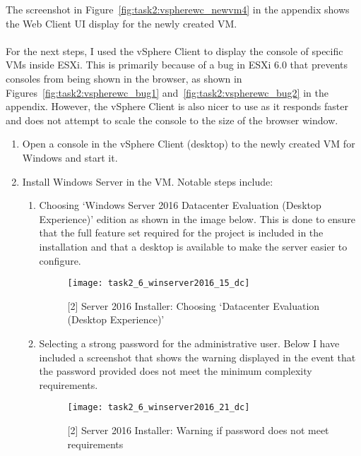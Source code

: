 \noindent The screenshot in Figure~\ref{fig:task2:vspherewc_newvm4} in the  appendix shows the Web Client UI display for the newly created VM.\\\\
\noindent For the next steps, I used the vSphere Client to display the console of specific VMs inside ESXi. This is primarily because of a bug in ESXi 6.0 that prevents consoles from being shown in the browser, as shown in Figures~\ref{fig:task2:vspherewc_bug1} and~\ref{fig:task2:vspherewc_bug2} in the  appendix. However, the vSphere Client is also nicer to use as it responds faster and does not attempt to scale the console to the size of the browser window.

\begin{enumerate}[resume*=task2methodology2]
  \item Open a console in the vSphere Client (desktop) to the newly created VM for Windows and start it.
  \item Install Windows Server in the VM. Notable steps include:
    \begin{enumerate}[label=(\alph*)]
      \item Choosing `Windows Server 2016 Datacenter Evaluation (Desktop Experience)' edition as shown in the image below. This is done to ensure that the full feature set required for the project is included in the installation and that a desktop is available to make the server easier to configure.
        \begin{figure}[H]
          \centering
          \captionsetup{skip=2pt}
          \texttt{[image: task2\_6\_winserver2016\_15\_dc]}
          \caption{[2] Server 2016 Installer: Choosing `Datacenter Evaluation (Desktop Experience)'}
          \label{fig:task2:vspherec_windc1}
        \end{figure}
      \item Selecting a strong password for the administrative user. Below I have included a screenshot that shows the warning displayed in the event that the password provided does not meet the minimum complexity requirements.
        \begin{figure}[H]
          \centering
          \captionsetup{skip=2pt}
          \texttt{[image: task2\_6\_winserver2016\_21\_dc]}
          \caption{[2] Server 2016 Installer: Warning if password does not meet requirements}
          \label{fig:task2:vspherec_windc2}
        \end{figure}
    \end{enumerate}
\end{enumerate}

